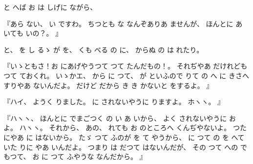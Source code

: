%
と
へば
お
は
しげに
ながら、

%
『あら
ない、
%
い
ですわ。
%
ちつとも
な
なんぞありあ
ませんが、
%
ほんとに
あ
いても
いの？。
』

%
と、
%
を
し
るゝ
が
を、
%
くも
べる
の
に、
%
からぬ
の
は
れたり。

%
『いゝともさ！お
にあげやうつて
つて
たんだもの！。
%
それぢやあ
だけれども
つて
ておくれ。
%
いゝかエ、
%
から
に
つて、
%
が
といふので
りて
の
へ
に
きさへすりやあ
ないんだよ。
%
だけど
だから
き
き
かないと
をするよ。
』

%
『ハイ、
%
ようく
りました。
%
に
されないやうに
りますよ。
%
ホヽヽ。
』

%
『ハヽヽ、
%
ほんとに
でまごつく
の
い
あ
いから、
%
よく
されないやうに
お
よ。
%
ハヽヽ。
%
それから、
%
あの、
%
れても
お
のところへ
くんぢやないよ。
%
つた
にやあ
に
はないから。
%
たゞ
つて
ふのが
を
て
やうから、
%
に
つて
の
を
へて
いた
りに
やあ
いんだよ。
%
つまり
は
だつて
はないんだが、
%
その
つて
への
でもつて、
%
お
に
つて
ふやうな
なんだから。
』

